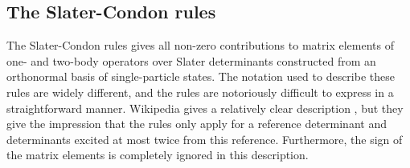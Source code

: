         \subsection{The Slater-Condon rules}
            The Slater-Condon rules \cite{slater-rules, condon-rules} gives all
            non-zero contributions to matrix elements of one- and two-body
            operators over Slater determinants constructed from an orthonormal
            basis of single-particle states.
            The notation used to describe these rules are widely different, and
            the rules are notoriously difficult to express in a straightforward
            manner.
            Wikipedia gives a relatively clear description
            \cite{wiki:slater-condon}, but they give the impression that the
            rules only apply for a reference determinant and determinants
            excited at most twice from this reference.
            Furthermore, the sign of the matrix elements is completely ignored
            in this description.

